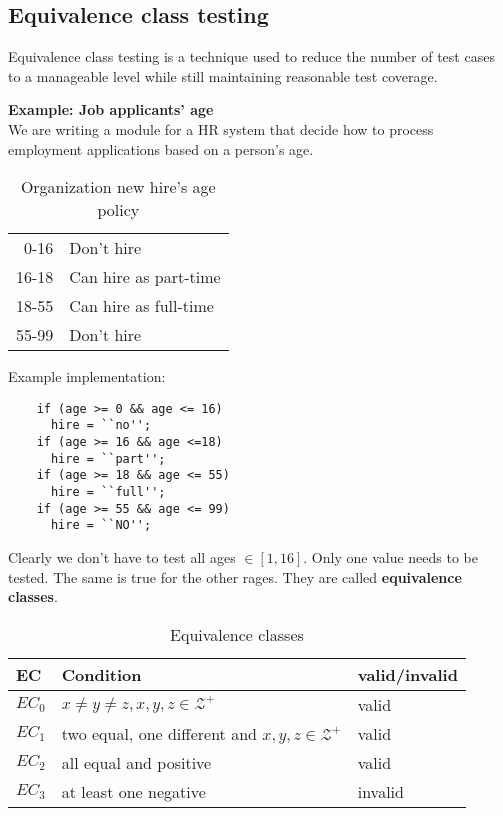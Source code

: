 \documentclass[a4paper]{article}
\begin{document}
\subsection{Equivalence class testing}
Equivalence class testing is a technique used to reduce the number of test cases
to a manageable level while still maintaining reasonable test coverage.
\begin{framed}
  \noindent\textbf{Example: Job applicants' age}\\
  We are writing a module for a HR system that decide how to process employment
  applications based on a person's age.
  \begin{table}[H]
    \centering
    \begin{tabular}{r l}
      0-16 & Don't hire\\
      16-18 & Can hire as part-time\\
      18-55 & Can hire as full-time\\
      55-99 & Don't hire
    \end{tabular}
    \caption{Organization new hire's age policy}
    \label{tab:agepolicy}
  \end{table}
  \noindent Example implementation:
  \begin{verbatim}
    if (age >= 0 && age <= 16)
      hire = ``no'';
    if (age >= 16 && age <=18)
      hire = ``part'';
    if (age >= 18 && age <= 55)
      hire = ``full'';
    if (age >= 55 && age <= 99)
      hire = ``NO'';
  \end{verbatim}
  \noindent Clearly we don't have to test all ages $\in [1,16]$. Only one value
  needs to be tested. The same is true for the other rages. They are called
  \textbf{equivalence classes}.
\end{framed}

\begin{table}[H]
  \centering
  \begin{tabular}{|l|l|l|}
    \hline
    EC & Condition & valid/invalid \\\hline
    $EC_0$ & $x \neq y \neq z,x,y,z\in \mathcal{Z}^+$ & valid\\ \hline
    $EC_1$ & two equal, one different and $x,y,z\in \mathcal{Z}^+$& valid
    \\\hline
    $EC_2$ & all equal and positive & valid \\\hline
    $EC_3$ & at least one negative & invalid \\\hline
  \end{tabular}
  \caption{Equivalence classes}
\end{table}
\end{document}
